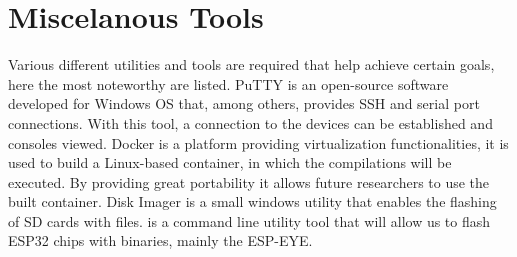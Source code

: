 \section{Miscelanous Tools}
Various different utilities and tools are required that help achieve certain goals, here the most noteworthy are listed. PuTTY is an open-source software developed for Windows OS that, among others, provides SSH and serial port connections. With this tool, a connection to the devices can be established and consoles viewed. Docker is a platform providing virtualization functionalities, it is used to build a Linux-based container, in which the compilations will be executed. By providing great portability it allows future researchers to use the built container. Disk Imager is a small windows utility that enables the flashing of SD cards with  files.  is a command line utility tool that will allow us to flash ESP32 chips with binaries, mainly the ESP-EYE.
